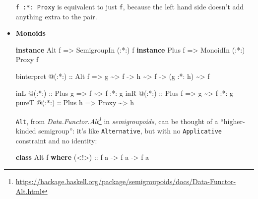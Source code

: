 \documentclass[]{article}
\newenvironment{Shaded}{}{}
\newcommand{\DataTypeTok}[1]{\textcolor[rgb]{0.56,0.13,0.00}{#1}}
\newcommand{\KeywordTok}[1]{\textcolor[rgb]{0.00,0.44,0.13}{\textbf{#1}}}
\newcommand{\NormalTok}[1]{#1}
\newcommand{\OperatorTok}[1]{\textcolor[rgb]{0.40,0.40,0.40}{#1}}
\newcommand{\OtherTok}[1]{\textcolor[rgb]{0.00,0.44,0.13}{#1}}
\renewcommand{\href}[2]{#2\footnote{\url{#1}}}
\begin{document}
\begin{itemize}
  \texttt{f\ :*:\ Proxy} is equivalent to just \texttt{f}, because the left hand
  side doesn't add anything extra to the pair.
\item
  \textbf{Monoids}

\begin{Shaded}
\begin{Highlighting}[]
\KeywordTok{instance} \DataTypeTok{Alt}\NormalTok{  f }\OtherTok{=\textgreater{}} \DataTypeTok{SemigroupIn}\NormalTok{ (}\OperatorTok{:*:}\NormalTok{) f}
\KeywordTok{instance} \DataTypeTok{Plus}\NormalTok{ f }\OtherTok{=\textgreater{}} \DataTypeTok{MonoidIn}\NormalTok{    (}\OperatorTok{:*:}\NormalTok{) }\DataTypeTok{Proxy}\NormalTok{ f}

\NormalTok{binterpret }\OperatorTok{@}\NormalTok{(}\OperatorTok{:*:}\NormalTok{)}
\OtherTok{    ::} \DataTypeTok{Alt}\NormalTok{ f}
    \OtherTok{=\textgreater{}}\NormalTok{ g }\OperatorTok{\textasciitilde{}\textgreater{}}\NormalTok{ f}
    \OtherTok{{-}\textgreater{}}\NormalTok{ h }\OperatorTok{\textasciitilde{}\textgreater{}}\NormalTok{ f}
    \OtherTok{{-}\textgreater{}}\NormalTok{ (g }\OperatorTok{:*:}\NormalTok{ h) }\OperatorTok{\textasciitilde{}\textgreater{}}\NormalTok{ f}

\NormalTok{inL   }\OperatorTok{@}\OtherTok{(:*:) ::} \DataTypeTok{Plus}\NormalTok{ g }\OtherTok{=\textgreater{}}\NormalTok{ f     }\OperatorTok{\textasciitilde{}\textgreater{}}\NormalTok{ f }\OperatorTok{:*:}\NormalTok{ g}
\NormalTok{inR   }\OperatorTok{@}\OtherTok{(:*:) ::} \DataTypeTok{Plus}\NormalTok{ f }\OtherTok{=\textgreater{}}\NormalTok{ g     }\OperatorTok{\textasciitilde{}\textgreater{}}\NormalTok{ f }\OperatorTok{:*:}\NormalTok{ g}
\NormalTok{pureT }\OperatorTok{@}\OtherTok{(:*:) ::} \DataTypeTok{Plus}\NormalTok{ h }\OtherTok{=\textgreater{}} \DataTypeTok{Proxy} \OperatorTok{\textasciitilde{}\textgreater{}}\NormalTok{ h}
\end{Highlighting}
\end{Shaded}

  \texttt{Alt}, from
  \emph{\href{https://hackage.haskell.org/package/semigroupoids/docs/Data-Functor-Alt.html}{Data.Functor.Alt}}
  in \emph{semigroupoids}, can be thought of a ``higher-kinded semigroup'': it's
  like \texttt{Alternative}, but with no \texttt{Applicative} constraint and no
  identity:

\begin{Shaded}
\begin{Highlighting}[]
\KeywordTok{class} \DataTypeTok{Alt}\NormalTok{ f }\KeywordTok{where}
\OtherTok{    (\textless{}!\textgreater{}) ::}\NormalTok{ f a }\OtherTok{{-}\textgreater{}}\NormalTok{ f a }\OtherTok{{-}\textgreater{}}\NormalTok{ f a}
\end{Highlighting}
\end{Shaded}


\end{itemize}
\end{document}
